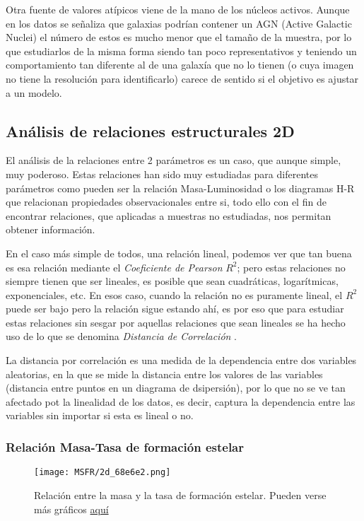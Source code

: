 \documentclass[11pt, a4paper]{article} %
\begin{document}
Otra fuente de valores atípicos viene de la mano de los núcleos activos. Aunque en los datos se señaliza que galaxias podrían contener un AGN (Active Galactic Nuclei) el número de estos es mucho menor que el tamaño de la muestra, por lo que estudiarlos
de la misma forma siendo tan poco representativos y teniendo un comportamiento tan diferente al de una galaxía que no lo tienen (o cuya imagen no tiene la resolución para identificarlo) carece de sentido si el objetivo es ajustar a un modelo. 

\subsection{Análisis de relaciones estructurales 2D}

El análisis de la relaciones entre 2 parámetros es un caso, que aunque simple, muy poderoso. Estas relaciones han sido muy estudiadas para diferentes parámetros 
como pueden ser la relación Masa-Luminosidad o los diagramas H-R que relacionan propiedades observacionales entre si, todo ello con el fin de encontrar relaciones, que aplicadas a muestras no estudiadas, nos permitan obtener información. 

En el caso más simple de todos, una relación lineal, podemos ver que tan buena es esa relación mediante el \textit{ Coeficiente de Pearson} $R^2$; pero 
estas relaciones no siempre tienen que ser lineales, es posible que sean cuadráticas, logarítmicas, exponenciales, etc. En esos caso, cuando la relación no es puramente lineal, el $R^2$ puede ser bajo
pero la relación sigue estando ahí, es por eso que para estudiar estas relaciones sin sesgar por aquellas relaciones que sean lineales se ha hecho uso de lo que se denomina \textit{Distancia de Correlación} \autocite{dcor}.

La distancia por correlación es una medida de la dependencia entre dos variables aleatorias, en la que se mide la distancia entre los valores de las variables (distancia entre puntos en un diagrama de dsipersión), por lo que no se ve tan afectado pot la 
linealidad de los datos, es decir, captura la dependencia entre las variables sin importar si esta es lineal o no.

\subsubsection{Relación Masa-Tasa de formación estelar}
\begin{figure}[H]
    \centering
    \texttt{[image: MSFR/2d\_68e6e2.png]}
    \caption{Relación entre la masa y la tasa de formación estelar. Pueden verse más gráficos \href{URL}{aquí}}
    \label{fig:pair_ex}
\end{figure}
\end{document}

